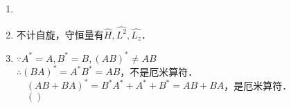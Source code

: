 
\begin{issues}
\issueDraft
\issueTODO
\end{issues}


\subsection{ }
\begin{enumerate}
\item 
\item 不计自旋，守恒量有$\hat H,\hat {L^2},\hat {L_z} $．
\item $\because A^* = A,B^* = B,(AB)^* \neq AB $ \\
$\therefore (BA)^* = A^*B^* = AB $，不是厄米算符． \\
$\quad (AB+BA)^* = B^*A^*+A^*+B^* = AB+BA $，是厄米算符． \\
$\quad () $
\end{enumerate}
\subsection{ }
